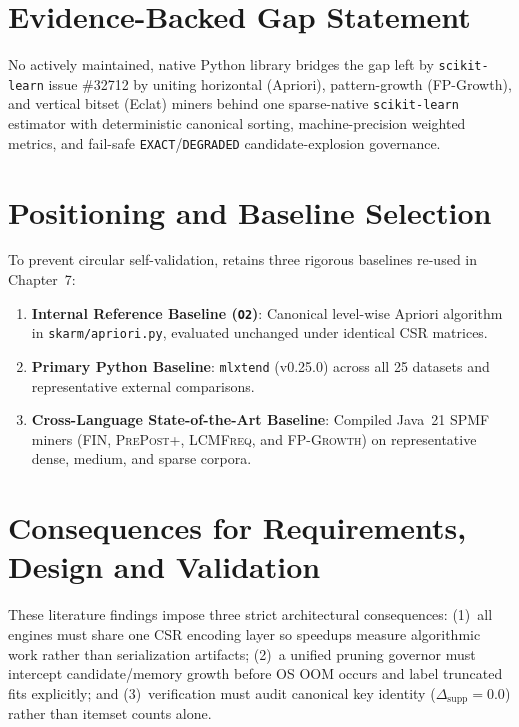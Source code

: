 \section{Evidence-Backed Gap Statement}
No actively maintained, native Python library bridges the gap left by \texttt{scikit-learn} issue \#32712 by uniting horizontal (Apriori), pattern-growth (FP-Growth), and vertical bitset (Eclat) miners behind one sparse-native \texttt{scikit-learn} estimator with deterministic canonical sorting, machine-precision weighted metrics, and fail-safe \texttt{EXACT}/\texttt{DEGRADED} candidate-explosion governance.

\section{Positioning and Baseline Selection}
To prevent circular self-validation, \skarm retains three rigorous baselines re-used in Chapter~7:
\begin{enumerate}
  \item \textbf{Internal Reference Baseline (\texttt{O2})}: Canonical level-wise Apriori algorithm in \texttt{skarm/\protect\allowbreak{}apriori.py}, evaluated unchanged under identical CSR matrices.
  \item \textbf{Primary Python Baseline}: \texttt{mlxtend} (v0.25.0) across all 25 datasets and representative external comparisons.
  \item \textbf{Cross-Language State-of-the-Art Baseline}: Compiled Java~21 SPMF miners (\textsc{FIN}, \textsc{PrePost+}, \textsc{LCMFreq}, and \textsc{FP-Growth}) on representative dense, medium, and sparse corpora.
\end{enumerate}

\section{Consequences for Requirements, Design and Validation}
These literature findings impose three strict architectural consequences: (1)~all engines must share one CSR encoding layer so speedups measure algorithmic work rather than serialization artifacts; (2)~a unified pruning governor must intercept candidate/memory growth before OS OOM occurs and label truncated fits explicitly; and (3)~verification must audit canonical key identity ($\Delta_{\mathrm{supp}}=0.0$) rather than itemset counts alone.

